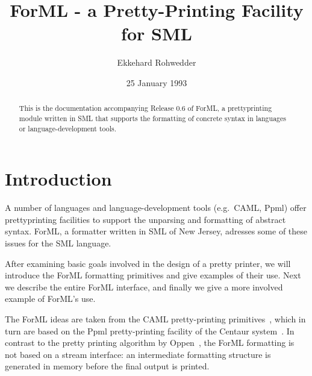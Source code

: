 \newcommand{\bsl}{/}
\oddsidemargin 0pt \evensidemargin 20pt \headheight 0pt
\headsep 0pt    %
\topmargin 0pt  %
\footheight 12pt \footskip 25pt \textheight 660pt \textwidth 469pt

\title{ForML - a Pretty-Printing Facility for SML}
\author{Ekkehard Rohwedder}
\date{25 January 1993}
 
\maketitle 
\begin{abstract}
This is the documentation accompanying Release 0.6
  of ForML, a prettyprinting
  module written in SML that supports the formatting of concrete syntax in
  languages or language-development tools.\\
\end{abstract}

\section{Introduction}

A number of languages and language-development tools (e.g.\ CAML, Ppml)
offer prettyprinting facilities to support the unparsing and formatting
of abstract syntax. 
ForML, a formatter written in SML of New Jersey, adresses some
of these issues for the SML language. 

After examining basic goals involved in the design of a pretty printer,
we will introduce the ForML formatting primitives and give examples of 
their use.
Next we  describe the entire ForML interface, and finally we give a more
involved example of ForML's use.

The ForML ideas are taken from the CAML pretty-printing
primitives~\cite{Weis88},
which in
turn are based on the Ppml pretty-printing facility of the Centaur
system~\cite{Ppml99}.
In contrast to the pretty printing algorithm by Oppen~\cite{Oppen80}, 
the ForML formatting is not based on a stream interface: an
intermediate formatting structure is generated in memory before the
final output is printed.


